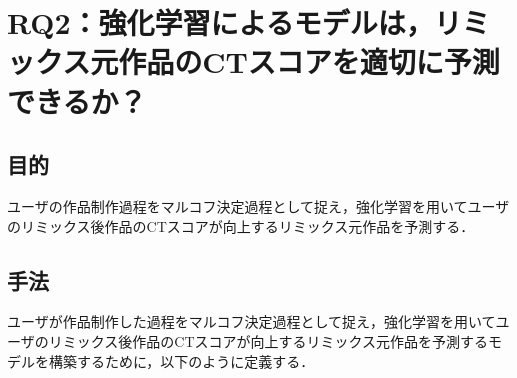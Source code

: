 \documentclass[submit,techrep,noauthor]{ipsj}
\begin{document}
\section{RQ2：強化学習によるモデルは，リミックス元作品のCTスコアを適切に予測できるか？}
\label{sec:rq2}

\subsection{目的}
ユーザの作品制作過程をマルコフ決定過程として捉え，強化学習を用いてユーザのリミックス後作品のCTスコアが向上するリミックス元作品を予測する．

\subsection{手法}
ユーザが作品制作した過程をマルコフ決定過程として捉え，強化学習を用いてユーザのリミックス後作品のCTスコアが向上するリミックス元作品を予測するモデルを構築するために，以下のように定義する．
\end{document}
